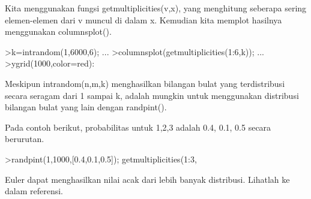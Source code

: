 \documentclass[a4paper,10pt]{article}
\begin{document}
\begin{eulernotebook}
\begin{eulercomment}
\begin{eulercomment}
\begin{eulercomment}
\begin{eulercomment}
\begin{eulercomment}
\begin{eulercomment}
\begin{eulercomment}
\begin{eulercomment}
\begin{eulercomment}
\begin{eulercomment}
\begin{eulercomment}
\begin{eulercomment}
\begin{eulercomment}
\begin{eulercomment}
\begin{eulercomment}
\begin{eulercomment}
\begin{eulercomment}
\begin{eulercomment}
\begin{eulercomment}
\begin{eulercomment}
\begin{eulercomment}
\begin{eulercomment}
\begin{eulercomment}
\begin{eulercomment}
\begin{eulercomment}
\begin{eulercomment}
\begin{eulercomment}
\begin{eulercomment}
\begin{eulercomment}
\begin{eulercomment}
\begin{eulercomment}
\begin{eulercomment}
\begin{eulercomment}
\begin{eulercomment}
\begin{eulercomment}
\begin{eulercomment}
\begin{eulercomment}
\begin{eulercomment}
\begin{eulercomment}
\begin{eulercomment}
\begin{eulercomment}
\begin{eulercomment}
\begin{eulercomment}
\begin{eulercomment}
\begin{eulercomment}
Kita menggunakan fungsi getmultiplicities(v,x), yang menghitung
seberapa sering elemen-elemen dari v muncul di dalam x. Kemudian kita
memplot hasilnya menggunakan columnsplot().
\end{eulercomment}
\begin{eulerprompt}
>k=intrandom(1,6000,6);  ...
>columnsplot(getmultiplicities(1:6,k));  ...
>ygrid(1000,color=red):
\end{eulerprompt}
\begin{eulercomment}
Meskipun intrandom(n,m,k) menghasilkan bilangan bulat yang
terdistribusi secara seragam dari 1 sampai k, adalah mungkin untuk
menggunakan distribusi bilangan bulat yang lain dengan randpint().

Pada contoh berikut, probabilitas untuk 1,2,3 adalah 0.4, 0.1, 0.5
secara berurutan.
\end{eulercomment}
\begin{eulerprompt}
>randpint(1,1000,[0.4,0.1,0.5]); getmultiplicities(1:3,%
\end{eulerprompt}
\begin{euleroutput}
  [378,  102,  520]
\end{euleroutput}
\begin{eulercomment}
Euler dapat menghasilkan nilai acak dari lebih banyak distribusi.
Lihatlah ke dalam referensi.


\end{eulercomment}
\end{eulercomment}
\end{eulercomment}
\end{eulercomment}
\end{eulercomment}
\end{eulercomment}
\end{eulercomment}
\end{eulercomment}
\end{eulercomment}
\end{eulercomment}
\end{eulercomment}
\end{eulercomment}
\end{eulercomment}
\end{eulercomment}
\end{eulercomment}
\end{eulercomment}
\end{eulercomment}
\end{eulercomment}
\end{eulercomment}
\end{eulercomment}
\end{eulercomment}
\end{eulercomment}
\end{eulercomment}
\end{eulercomment}
\end{eulercomment}
\end{eulercomment}
\end{eulercomment}
\end{eulercomment}
\end{eulercomment}
\end{eulercomment}
\end{eulercomment}
\end{eulercomment}
\end{eulercomment}
\end{eulercomment}
\end{eulercomment}
\end{eulercomment}
\end{eulercomment}
\end{eulercomment}
\end{eulercomment}
\end{eulercomment}
\end{eulercomment}
\end{eulercomment}
\end{eulercomment}
\end{eulercomment}
\end{eulercomment}
\end{eulernotebook}
\end{document}
